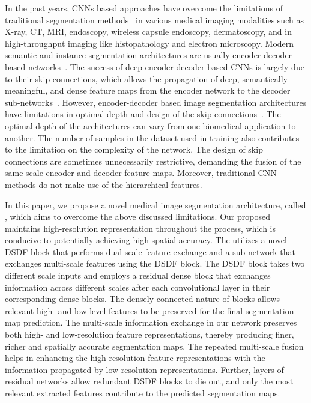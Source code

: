 \documentclass[journal,twoside,web]{IEEEtran}
\newcommand{\sysname}{\text{MSRF-Net}\xspace}
\begin{document}
In the past years, \acp{CNN} based approaches have overcome the limitations of traditional segmentation methods~\cite{litjens2017survey} in various medical imaging modalities such as X-ray, \ac{CT}, \ac{MRI}, endoscopy, wireless capsule endoscopy, dermatoscopy, and in high-throughput imaging like histopathology and electron microscopy. Modern semantic and instance segmentation architectures are usually encoder-decoder based networks~\cite{shen2017deep,ross2020robust}. The success of deep encoder-decoder based \acp{CNN} is largely due to their skip connections, which allows the propagation of deep, semantically meaningful, and dense feature maps from the encoder network to the decoder sub-networks~\cite{drozdzal2016importance,jha2020doubleu}. However, encoder-decoder based image segmentation architectures have limitations in optimal depth and design of the skip connections~\cite{zhou2019unet++}. The optimal depth of the architectures can vary from one biomedical application to another. The number of samples in the dataset used in training also contributes to the limitation on the complexity of the network. The design of skip connections are sometimes unnecessarily restrictive, demanding the fusion of the same-scale encoder and decoder feature maps. Moreover, traditional \ac{CNN} methods do not make use of the hierarchical features.

In this paper, we propose a novel medical image segmentation architecture, called \emph{\sysname}, which aims to overcome the above discussed limitations. Our proposed \sysname maintains high-resolution representation throughout the process, which is conducive to potentially achieving high spatial accuracy. The \sysname utilizes a novel \ac{DSDF} block that performs dual scale feature exchange and a sub-network that exchanges multi-scale features using the \ac{DSDF} block. The \ac{DSDF} block takes two different scale inputs and employs a residual dense block that exchanges information across different scales after each convolutional layer in their corresponding dense blocks. The densely connected nature of blocks allows relevant high- and low-level features to be preserved for the final segmentation map prediction. The multi-scale information exchange in our network preserves both high- and low-resolution feature representations, thereby producing finer, richer and spatially accurate segmentation maps. The repeated multi-scale fusion helps in enhancing the high-resolution feature representations with the information propagated by low-resolution representations. Further, layers of residual networks allow redundant \ac{DSDF} blocks to die out, and only the most relevant extracted features contribute to the predicted segmentation maps. 
\end{document}
